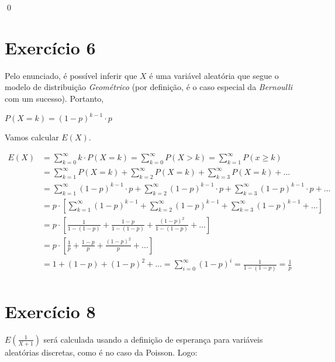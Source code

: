 \documentclass[12pt,letterpaper]{article}
\begin{document}
	\qed
	
	\section*{Exercício 6}
	
	Pelo enunciado, é possível inferir que $X$ é uma variável aleatória que segue o modelo de distribuição \textit{Geométrico} (por definição, é o caso especial da \textit{Bernoulli} com um sucesso). Portanto, 
	
	\begin{center}
		$P(X=k) = (1-p)^{k-1} \cdot p$
	\end{center}
	
	Vamos calcular $E(X)$. 
	
	\begin{equation*}
		\begin{split}
			E(X) & = \sum_{k=0}^{\infty} k \cdot P(X=k) = \sum_{k=0}^{\infty} P(X>k) = \sum_{k=1}^{\infty} P(x \geq k)\\ 
			& = \sum_{k=1}^{\infty} P(X=k) + \sum_{k=2}^{\infty} P(X=k) + \sum_{k=3}^{\infty} P(X=k) +... \\
			& = \sum_{k=1}^{\infty} (1-p)^{k-1} \cdot p + \sum_{k=2}^{\infty} (1-p)^{k-1} \cdot p + \sum_{k=3}^{\infty} (1-p)^{k-1} \cdot p + ... \\
			& = p \cdot [\sum_{k=1}^{\infty} (1-p)^{k-1} + \sum_{k=2}^{\infty} (1-p)^{k-1} + \sum_{k=3}^{\infty} (1-p)^{k-1} + ...]\\
			& = p \cdot [\frac{1}{1-(1-p)} + \frac{1-p}{1-(1-p)} + \frac{(1-p)^2}{1-(1-p)} + ...]\\
			& = p \cdot [\frac{1}{p} + \frac{1-p}{p} + \frac{(1-p)^2}{p} + ...]\\
			& = 1 + (1-p) + (1-p)^2 + ... = \sum_{i = 0}^{\infty} (1-p)^i = \frac{1}{1-(1-p)} = \frac{1}{p}\\
		\end{split}
	\end{equation*}
	
	\section*{Exercício 8}
	
	$E(\frac{1}{X+1})$ será calculada usando a definição de esperança para variáveis aleatórias discretas, como é no caso da Poisson. Logo:
	
\end{document}
